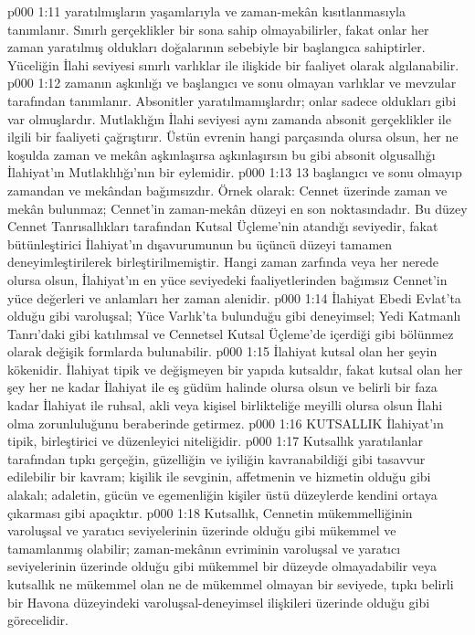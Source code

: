 \vs p000 1:11  yaratılmışların yaşamlarıyla ve zaman\hyp{}mekân kısıtlanmasıyla tanımlanır. Sınırlı gerçeklikler bir sona sahip olmayabilirler, fakat onlar her zaman yaratılmış oldukları doğalarının sebebiyle bir başlangıca sahiptirler. Yüceliğin İlahi seviyesi sınırlı varlıklar ile ilişkide bir faaliyet olarak algılanabilir.
\vs p000 1:12  zamanın aşkınlığı ve başlangıcı ve sonu olmayan varlıklar ve mevzular tarafından tanımlanır. Absonitler yaratılmamışlardır; onlar sadece oldukları gibi var olmuşlardır. Mutlaklığın İlahi seviyesi aynı zamanda absonit gerçeklikler ile ilgili bir faaliyeti çağrıştırır. Üstün evrenin hangi parçasında olursa olsun, her ne koşulda zaman ve mekân aşkınlaşırsa aşkınlaşırsın bu gibi absonit olgusallığı İlahiyat’ın Mutlaklılığı’nın bir eylemidir.
\vs p000 1:13 13  başlangıcı ve sonu olmayıp zamandan ve mekândan bağımsızdır. Örnek olarak: Cennet üzerinde zaman ve mekân bulunmaz; Cennet’in zaman\hyp{}mekân düzeyi en son noktasındadır. Bu düzey Cennet Tanrısallıkları tarafından Kutsal Üçleme’nin atandığı seviyedir, fakat bütünleştirici İlahiyat’ın dışavurumunun bu üçüncü düzeyi tamamen deneyimleştirilerek birleştirilmemiştir. Hangi zaman zarfında veya her nerede olursa olsun, İlahiyat’ın en yüce seviyedeki faaliyetlerinden bağımsız Cennet’in yüce değerleri ve anlamları her zaman alenidir.
\vs p000 1:14 İlahiyat Ebedi Evlat’ta olduğu gibi varoluşsal; Yüce Varlık’ta bulunduğu gibi deneyimsel; Yedi Katmanlı Tanrı’daki gibi katılımsal ve Cennetsel Kutsal Üçleme’de içerdiği gibi bölünmez olarak değişik formlarda bulunabilir.
\vs p000 1:15 İlahiyat kutsal olan her şeyin kökenidir. İlahiyat tipik ve değişmeyen bir yapıda kutsaldır, fakat kutsal olan her şey her ne kadar İlahiyat ile eş güdüm halinde olursa olsun ve belirli bir faza kadar İlahiyat ile ruhsal, akli veya kişisel birlikteliğe meyilli olursa olsun İlahi olma zorunluluğunu beraberinde getirmez.
\vs p000 1:16 KUTSALLIK İlahiyat’ın tipik, birleştirici ve düzenleyici niteliğidir.
\vs p000 1:17 Kutsallık yaratılanlar tarafından tıpkı gerçeğin, güzelliğin ve iyiliğin kavranabildiği gibi tasavvur edilebilir bir kavram; kişilik ile sevginin, affetmenin ve hizmetin olduğu gibi alakalı; adaletin, gücün ve egemenliğin kişiler üstü düzeylerde kendini ortaya çıkarması gibi apaçıktır.
\vs p000 1:18 Kutsallık, Cennetin mükemmelliğinin varoluşsal ve yaratıcı seviyelerinin üzerinde olduğu gibi mükemmel ve tamamlanmış olabilir; zaman\hyp{}mekânın evriminin varoluşsal ve yaratıcı seviyelerinin üzerinde olduğu gibi mükemmel bir düzeyde olmayadabilir veya kutsallık ne mükemmel olan ne de mükemmel olmayan bir seviyede, tıpkı belirli bir Havona düzeyindeki varoluşsal\hyp{}deneyimsel ilişkileri üzerinde olduğu gibi görecelidir.
